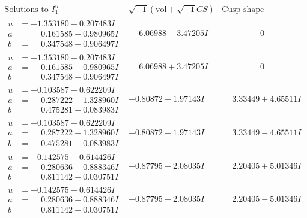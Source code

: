 \documentclass[1p]{elsarticle_modified}
\theoremstyle{definition}
\newcommand{\I}{\sqrt{-1}}
\begin{document}
$$\begin{array}{c|c|c}
\text{Solutions to }I^u_{1}& \I (\text{vol} + \sqrt{-1}CS) & \text{Cusp shape}\\
 \hline 
\begin{aligned}
u &= -1.353180 + 0.207483 I \\
a &= \phantom{-}0.161585 + 0.980965 I \\
b &= \phantom{-}0.347548 + 0.906497 I\end{aligned}
 & \phantom{-}6.06988 - 3.47205 I & \phantom{-0.000000 } 0 \\ \hline\begin{aligned}
u &= -1.353180 - 0.207483 I \\
a &= \phantom{-}0.161585 - 0.980965 I \\
b &= \phantom{-}0.347548 - 0.906497 I\end{aligned}
 & \phantom{-}6.06988 + 3.47205 I & \phantom{-0.000000 } 0 \\ \hline\begin{aligned}
u &= -0.103587 + 0.622209 I \\
a &= \phantom{-}0.287222 - 1.328960 I \\
b &= \phantom{-}0.475281 - 0.083983 I\end{aligned}
 & -0.80872 - 1.97143 I & \phantom{-}3.33449 + 4.65511 I \\ \hline\begin{aligned}
u &= -0.103587 - 0.622209 I \\
a &= \phantom{-}0.287222 + 1.328960 I \\
b &= \phantom{-}0.475281 + 0.083983 I\end{aligned}
 & -0.80872 + 1.97143 I & \phantom{-}3.33449 - 4.65511 I \\ \hline\begin{aligned}
u &= -0.142575 + 0.614426 I \\
a &= \phantom{-}0.280636 - 0.888346 I \\
b &= \phantom{-}0.811142 - 0.030751 I\end{aligned}
 & -0.87795 - 2.08035 I & \phantom{-}2.20405 + 5.01346 I \\ \hline\begin{aligned}
u &= -0.142575 - 0.614426 I \\
a &= \phantom{-}0.280636 + 0.888346 I \\
b &= \phantom{-}0.811142 + 0.030751 I\end{aligned}
 & -0.87795 + 2.08035 I & \phantom{-}2.20405 - 5.01346 I \\ \hline\begin{aligned}

\end{aligned}
\end{array}$$
\end{document}
